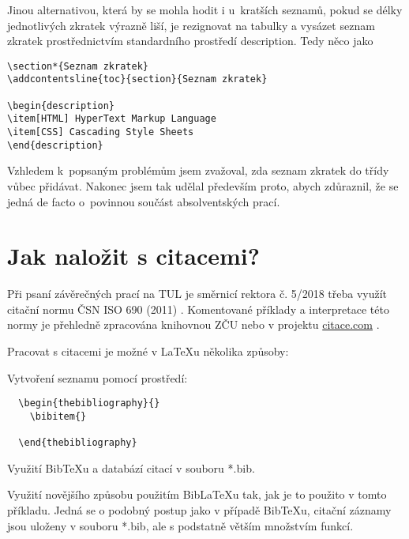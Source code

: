 \documentclass[FM,BP]{tulthesis}
\newcommand{\argument}[1]{{\ttfamily\color{\tulcolor}#1}}
\newenvironment{myquote}{\begin{list}{}{\setlength\leftmargin\parindent}\item[]}{\end{list}}
\newenvironment{listing}{\begin{myquote}\color{\tulcolor}}{\end{myquote}}
\begin{document}
Jinou alternativou, která by se mohla hodit i u~kratších seznamů, pokud se
délky jednotlivých zkratek výrazně liší, je rezignovat na tabulky a vysázet
seznam zkratek prostřednictvím standardního prostředí \argument{description}.
Tedy něco jako

\begin{listing}
\begin{verbatim}
\section*{Seznam zkratek}
\addcontentsline{toc}{section}{Seznam zkratek}

\begin{description}
\item[HTML] HyperText Markup Language
\item[CSS] Cascading Style Sheets
\end{description}
\end{verbatim}
\end{listing}

Vzhledem k~popsaným problémům jsem zvažoval, zda seznam zkratek do třídy vůbec
přidávat. Nakonec jsem tak udělal především proto, abych zdůraznil, že se jedná
de facto o~povinnou součást absolventských prací.

\chapter{Jak naložit s citacemi?}

Při psaní závěrečných prací na TUL je směrnicí rektora č. 5/2018 třeba využít citační normu ČSN ISO 690 (2011) \cite{csniso690}. Komentované příklady a interpretace této normy je přehledně zpracována knihovnou ZČU nebo v projektu \hyperlink{citace.com}{citace.com} \cite{csniso690ZCU,csniso690citaceCOM}.

Pracovat s citacemi je možné v \LaTeX{}u několika způsoby: 
\begin{enumerate}
  \item Vytvoření seznamu pomocí prostředí: 
  \begin{listing}
  \begin{verbatim}
  \begin{thebibliography}{}
    \bibitem{}
   
  \end{thebibliography}
  \end{verbatim}
  \end{listing}
  \item Využití Bib\TeX{}u a databází citací v souboru \argument{*.bib}.
  \item Využití novějšího způsobu použitím Bib\LaTeX{}u tak, jak je to použito v tomto příkladu. Jedná se o podobný postup jako v případě Bib\TeX{}u, citační záznamy jsou uloženy v souboru \argument{*.bib}, ale s podstatně větším množstvím funkcí. 
\end{enumerate}
\end{document}
